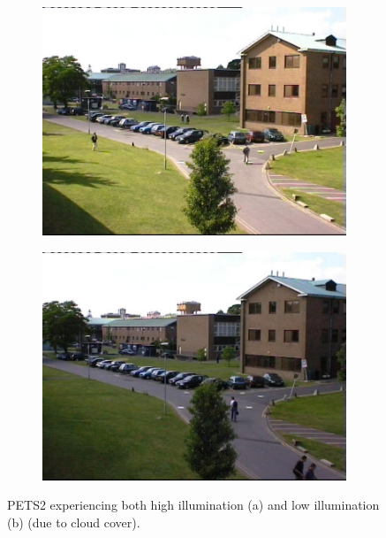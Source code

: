 \begin{figure}
\centering
\begin{subfigure}{.48\linewidth}
  \includegraphics[width=1\linewidth]{figures/PETS2_highv.jpg}
  \caption{}
\end{subfigure}
\hfill
\begin{subfigure}{.48\linewidth}
  \includegraphics[width=1\linewidth]{figures/PETS2_lowv.jpg}
  \caption{}
\end{subfigure}
\caption{PETS2 experiencing both high illumination (a) and low illumination (b) (due to cloud cover).}
\label{fig:pets2illum}
\end{figure}

